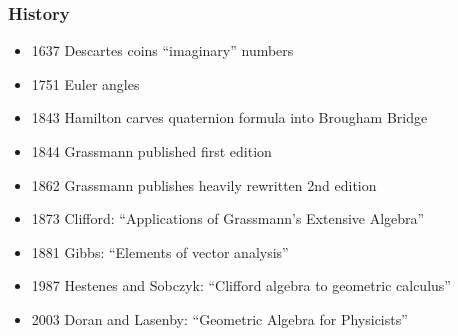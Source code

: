 \documentclass[12pt,xcolor={dvipsnames}]{beamer}
\begin{document}
\begin{frame}
  \frametitle{History}
  \begingroup
  \fontsize{0.8em}{1.em}\selectfont
  \begin{itemize}
   \item 1637 Descartes coins ``imaginary'' numbers
   \item 1751 Euler angles
   \item 1843 Hamilton carves quaternion formula into Brougham Bridge
   \item 1844 Grassmann published first edition
   \item 1862 Grassmann publishes heavily rewritten 2nd edition
   \item 1873 Clifford: ``Applications of Grassmann's
    Extensive Algebra''
   \item 1881 Gibbs: ``Elements of vector analysis''
   \item 1987 Hestenes and Sobczyk: ``Clifford algebra to geometric
    calculus''
   \item 2003 Doran and Lasenby: ``Geometric Algebra for Physicists''
  \end{itemize}
  \endgroup
\end{frame}



\section{}


\end{document}
